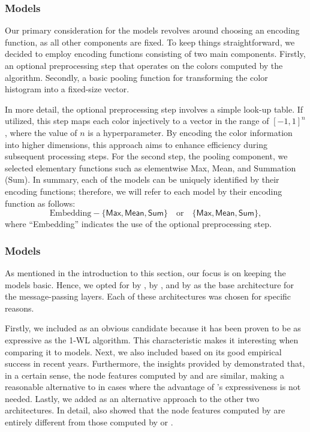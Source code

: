 \subsubsection{\wlnn Models}
Our primary consideration for the \wlnn models revolves around choosing an encoding function, as all other components are fixed. To keep things straightforward, we decided to employ encoding functions consisting of two main components. Firstly, an optional preprocessing step that operates on the colors computed by the \wl algorithm. Secondly, a basic pooling function for transforming the color histogram into a fixed-size vector.

In more detail, the optional preprocessing step involves a simple look-up table. If utilized, this step maps each color injectively to a vector in the range of $[-1, 1]^n$, where the value of $n$ is a hyperparameter. By encoding the color information into higher dimensions, this approach aims to enhance efficiency during subsequent processing steps. For the second step, the pooling component, we selected elementary functions such as elementwise \textsf{Max}, \textsf{Mean}, and Summation (\textsf{Sum}). In summary, each of the \wlnn models can be uniquely identified by their encoding functions; therefore, we will refer to each model by their encoding function as follows:
\begin{equation*}
	\text{Embedding}-\{\textsf{Max}, \textsf{Mean}, \textsf{Sum}\} \quad \text{or} \quad \{\textsf{Max}, \textsf{Mean}, \textsf{Sum}\},
\end{equation*}
where ``Embedding'' indicates the use of the optional preprocessing step.

\subsubsection{\gnn Models}
As mentioned in the introduction to this section, our focus is on keeping the models basic. Hence, we opted for \gin by \cite{Xu2018}, \gcn by \cite{Kip+2017}, and \gat by \cite{Velivckovic2017} as the base architecture for the message-passing layers. Each of these architectures was chosen for specific reasons.

Firstly, we included \gin as an obvious candidate because it has been proven to be as expressive as the 1-WL algorithm. This characteristic makes it interesting when comparing it to \wlnn models.
Next, we also included \gcn based on its good empirical success in recent years. Furthermore, the insights provided by \cite{Nikolentzos2023} demonstrated that, in a certain sense, the node features computed by \gcn and \gin are similar, making \gcn a reasonable alternative to \gin in cases where the advantage of \gin's expressiveness is not needed.
Lastly, we added \gat as an alternative approach to the other two architectures. In detail, \cite{Nikolentzos2023} also showed that the node features computed by \gat are entirely different from those computed by \gin or \gcn.

